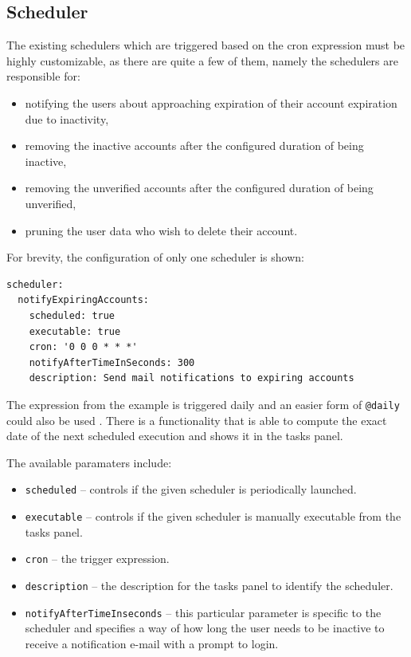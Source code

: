 \documentclass[a4paper,twoside,12pt]{book}
\begin{document}
\subsection{Scheduler}

The existing schedulers which are triggered based on the cron expression must be highly customizable, as there are quite a few of them, namely the schedulers are responsible for:
\begin{itemize}
\item notifying the users about approaching expiration of their account expiration due to inactivity,
\item removing the inactive accounts after the configured duration of being inactive,
\item removing the unverified accounts after the configured duration of being unverified,
\item pruning the user data who wish to delete their account.
\end{itemize}

For brevity, the configuration of only one scheduler is shown:
\begin{verbatim}
scheduler:
  notifyExpiringAccounts:
    scheduled: true
    executable: true
    cron: '0 0 0 * * *'
    notifyAfterTimeInSeconds: 300
    description: Send mail notifications to expiring accounts
\end{verbatim}

The expression from the example is triggered daily and an easier form of \verb|@daily| could also be used \cite{bib:spring_cron}. There is a functionality that is able to compute the exact date of the next scheduled execution and shows it in the tasks panel.

The available paramaters include:
\begin{itemize}
\item \verb|scheduled| -- controls if the given scheduler is periodically launched.
\item \verb|executable| -- controls if the given scheduler is manually executable from the tasks panel.
\item \verb|cron| -- the trigger expression. 
\item \verb|description| -- the description for the tasks panel to identify the scheduler.
\item \verb|notifyAfterTimeInseconds| -- this particular parameter is specific to the scheduler and specifies a way of how long the user needs to be inactive to receive a notification e-mail with a prompt to login.
\end{itemize}
\end{document}
